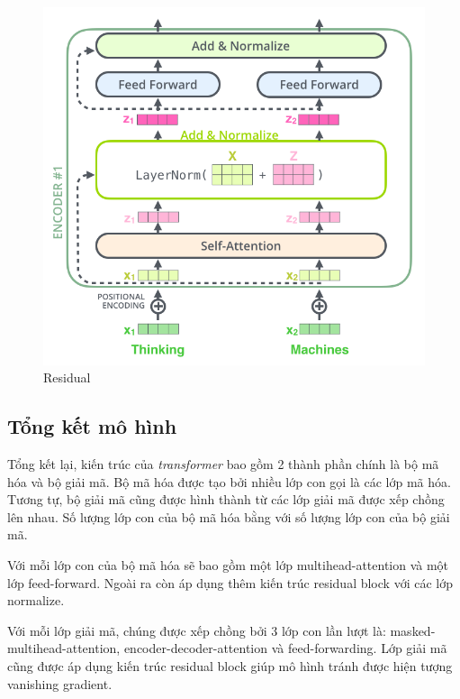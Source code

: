\begin{figure}[H]
    \begin{center}
        \includegraphics[scale=0.5]{images/residual}
        \caption{Residual}
        \label{fig:residual}
    \end{center}
\end{figure}


\subsection{Tổng kết mô hình}

Tổng kết lại, kiến trúc của  \textit{transformer}  bao gồm 2 thành phần chính là bộ mã hóa và bộ giải mã. Bộ mã hóa được tạo bởi nhiều lớp con gọi là các lớp mã hóa. Tương tự, bộ giải mã cũng được hình thành từ các lớp giải mã được xếp chồng lên nhau. Số lượng lớp con của bộ mã hóa bằng với số lượng lớp con của bộ giải mã.

Với mỗi lớp con của bộ mã hóa sẽ bao gồm một lớp multihead-attention và một lớp feed-forward. Ngoài ra còn áp dụng thêm kiến trúc residual block với các lớp normalize.

Với mỗi lớp giải mã, chúng được xếp chồng bởi 3 lớp con lần lượt là: masked-multihead-attention, encoder-decoder-attention và feed-forwarding. Lớp giải mã cũng được áp dụng kiến trúc residual block giúp mô hình tránh được hiện tượng vanishing gradient.

